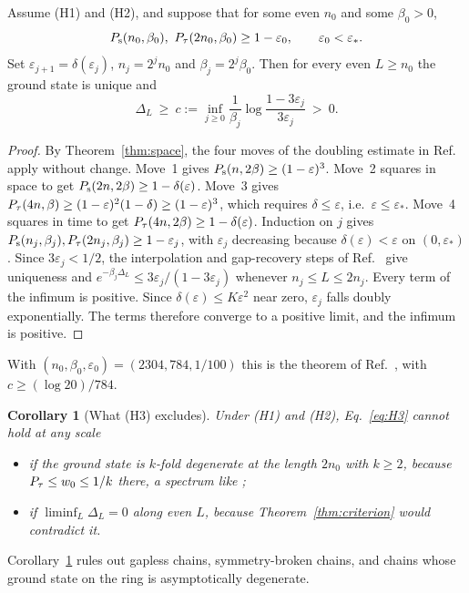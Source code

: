 \documentclass[aps,prl,reprint,amsmath,amssymb,nofootinbib,raggedbottom]{revtex4-2}
\newtheorem{corollary}{Corollary}
\begin{document}
\begin{theorem}\label{thm:criterion}
Assume (H1) and (H2), and suppose that for some even $n_0$ and some $\beta_0>0$,
\begin{equation}
 \Ps(n_0,\beta_0),\ \Pt(2n_0,\beta_0)\ge1-\varepsilon_0,\qquad
 \varepsilon_0<\varepsilon_* .
 \label{eq:H3}
\end{equation}
Set $\varepsilon_{j+1}=\delta(\varepsilon_j)$, $n_j=2^jn_0$ and
$\beta_j=2^j\beta_0$. Then for every even $L\ge n_0$ the ground state
is unique and
\begin{equation}
 \Delta_L\ \ge\ c:=\inf_{j\ge0}\frac1{\beta_j}
 \log\frac{1-3\varepsilon_j}{3\varepsilon_j}\ >\ 0 .
 \label{eq:c}
\end{equation}
\end{theorem}
\begin{proof}
By Theorem~\ref{thm:space}, the four moves of the doubling estimate in
Ref.~\cite{main} apply without change. Move~1 gives
$P_{\mathrm s}(n,2\beta)\ge(1-\varepsilon)^3$. Move~2 squares in space to get
$P_{\mathrm s}(2n,2\beta)\ge1-\delta(\varepsilon)$. Move~3 gives
$P_{\tau}(4n,\beta)\ge(1-\varepsilon)^2(1-\delta)\ge(1-\varepsilon)^3$, which
requires $\delta\le\varepsilon$, i.e.\ $\varepsilon\le\varepsilon_*$.
Move~4 squares in time to get $P_{\tau}(4n,2\beta)\ge1-\delta(\varepsilon)$.
Induction on $j$ gives
$P_{\mathrm s}(n_j,\beta_j),P_{\tau}(2n_j,\beta_j)\ge1-\varepsilon_j$, with
$\varepsilon_j$ decreasing because $\delta(\varepsilon)<\varepsilon$ on
$(0,\varepsilon_*)$.
Since $3\varepsilon_j<1/2$, the interpolation and gap-recovery steps of
Ref.~\cite{main} give uniqueness and $e^{-\beta_j\Delta_L}\le
3\varepsilon_j/(1-3\varepsilon_j)$ whenever $n_j\le L\le2n_j$.
Every term of the infimum is positive. Since
$\delta(\varepsilon)\le K\varepsilon^2$ near zero, $\varepsilon_j$ falls
doubly exponentially. The terms therefore converge to a positive limit, and
the infimum is positive.
\end{proof}
With $(n_0,\beta_0,\varepsilon_0)=(2304,784,1/100)$ this is the theorem of
Ref.~\cite{main}, with $c\ge(\log20)/784$.

\begin{corollary}[What (H3) excludes]\label{cor:obstruct}
Under (H1) and (H2), Eq.~\eqref{eq:H3} cannot hold at any scale
\begin{itemize}
\item[(i)] if the ground state is $k$-fold degenerate at the length $2n_0$
with $k\ge2$, because $P_{\tau}\le w_0\le1/k$ there, a spectrum like ;
\item[(ii)] if $\liminf_L\Delta_L=0$ along even $L$, because
Theorem~\ref{thm:criterion} would contradict it.
\end{itemize}
\end{corollary}
Corollary~\ref{cor:obstruct} rules out gapless chains, symmetry-broken
chains, and chains whose ground state on the ring is asymptotically
degenerate.
\end{document}
